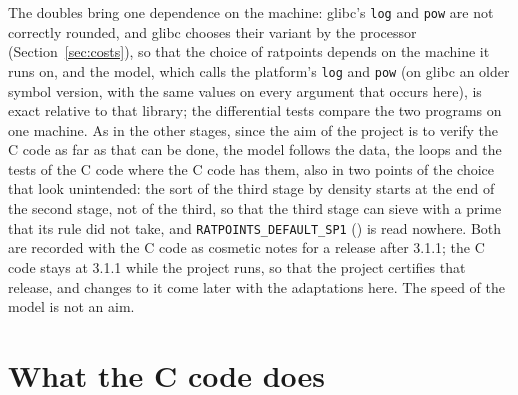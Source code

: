 The doubles bring one dependence on the machine: glibc's \verb|log| and \verb|pow| are not correctly
rounded, and glibc chooses their variant by the processor (Section~\ref{sec:costs}), so that the
choice of ratpoints depends on the machine it runs on, and the model, which calls the platform's
\verb|log| and \verb|pow| (on glibc an older symbol version, with the same values on every argument
that occurs here), is exact relative to that library; the differential tests compare the two
programs on one machine. As in the other stages, since the aim of the project is to verify the C
code as far as that can be done, the model follows the data, the loops and the tests of the C code
where the C code has them, also in two points of the choice that look unintended: the sort of the
third stage by density starts at the end of the second stage, not of the third, so that the third
stage can sieve with a prime that its rule did not take, and \verb|RATPOINTS_DEFAULT_SP1|
() is read nowhere. Both are recorded with the C code as cosmetic notes
for a release after 3.1.1; the C code stays at 3.1.1 while the project runs, so that the project
certifies that release, and changes to it come later with the adaptations here. The speed of the
model is not an aim.

\section{What the C code does}\label{sec:moduliC}

